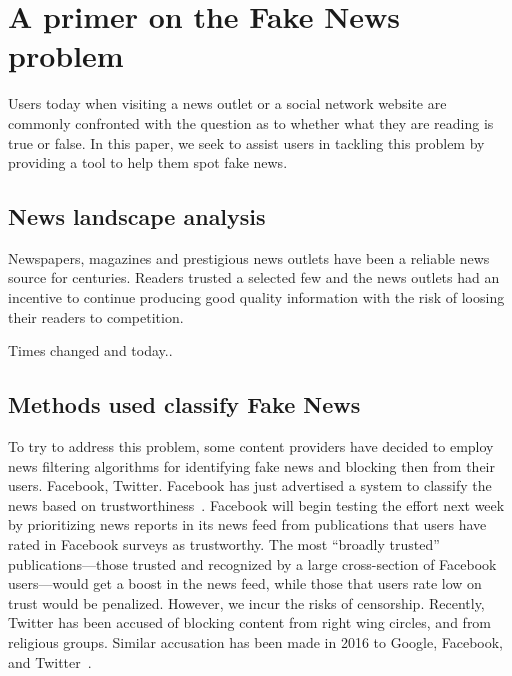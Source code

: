 
\section{A primer on the Fake News problem}

Users today when visiting a news outlet or a social network website are commonly confronted with the question as to whether what they are reading is true or false. In this paper, we seek to assist users in tackling this problem by providing a tool to help them spot fake news.

\subsection{News landscape analysis}

Newspapers, magazines and prestigious news outlets have been a reliable news source for centuries. Readers trusted a selected few and the news outlets had an incentive to continue producing good quality information with the risk of loosing their readers to competition. 

Times changed and today.. 

\subsection{Methods used classify Fake News}

 To try to address this problem, some content providers have decided to employ news filtering algorithms for identifying fake news and blocking then from their users. Facebook, Twitter. Facebook has just advertised a system to classify the news based on trustworthiness~\cite{fbrank}. Facebook will begin testing the effort next week by prioritizing news reports in its news feed from publications that users have rated in Facebook surveys as trustworthy. The most ``broadly trusted'' publications—those trusted and recognized by a large cross-section of Facebook users—would get a boost in the news feed, while those that users rate low on trust would be penalized. However, we incur the risks of censorship. Recently, Twitter has been accused of blocking content from right wing circles, and from religious groups. Similar accusation has been made in 2016 to Google, Facebook, and Twitter~\cite{accusedskew}.

